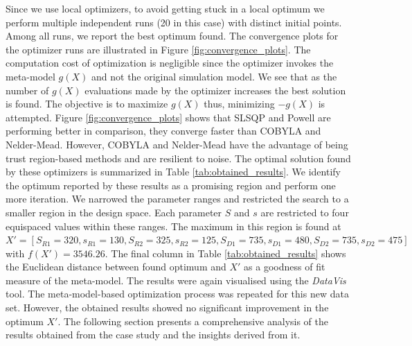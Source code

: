 Since we use local optimizers, to avoid getting stuck in a local optimum we perform multiple independent runs (20 in this case) with distinct initial points. Among all runs, we report the best optimum found. The convergence plots for the optimizer runs are illustrated in Figure \ref{fig:convergence_plots}. The computation cost of optimization is negligible since the optimizer invokes the meta-model $g(X)$ and not the original simulation model. We see that as the number of $g(X)$ evaluations made by the optimizer increases the best solution is found. The objective is to maximize $g(X)$ thus, minimizing $-g(X)$ is attempted. Figure \ref{fig:convergence_plots} shows that SLSQP and Powell are performing better in comparison, they converge faster than COBYLA and Nelder-Mead. However, COBYLA and Nelder-Mead have the advantage of being trust region-based methods and are resilient to noise. The optimal solution found by these optimizers is summarized in Table \ref{tab:obtained_results}. We identify the optimum reported by these results as a promising region and perform one more iteration. We narrowed the parameter ranges and restricted the search to a smaller region in the design space. Each parameter $S$ and $s$ are restricted to four equispaced values within these ranges. The maximum in this region is found at $X' = [S_{R1}=320, s_{R1}=130, S_{R2}=325, s_{R2}=125, S_{D1}=735, s_{D1}=480, S_{D2}=735, s_{D2}=475]$ with $f(X') = 3546.26$. The final column in Table \ref{tab:obtained_results} shows the Euclidean distance between found optimum and $X'$ as a goodness of fit measure of the meta-model. The results were again visualised using the \textit{DataVis} tool. The meta-model-based optimization process was repeated for this new data set. However, the obtained results showed no significant improvement in the optimum $X'$. The following section presents a comprehensive analysis of the results obtained from the case study and the insights derived from it.
